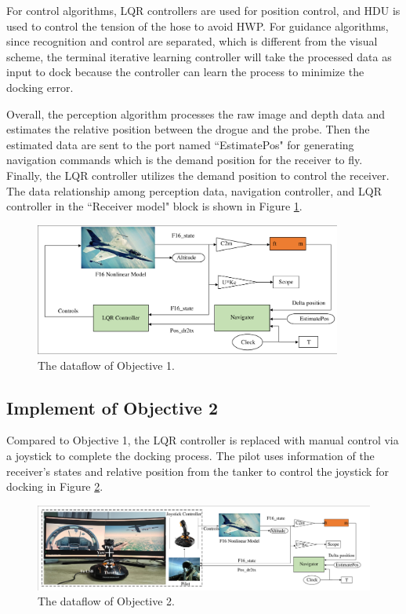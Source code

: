 For control algorithms, LQR controllers are used for position control, and HDU is used to control the tension of the hose to avoid HWP. For guidance algorithms, since recognition and control are separated, which is different from the visual scheme\cite{dayong2022robust,costello2023transference,duan2020bionic}, the terminal iterative learning controller will take the processed data as input to dock because the controller can learn the process to minimize the docking error. 

Overall, the perception algorithm processes the raw image and depth data and estimates the relative position between the drogue and the probe. Then the estimated data are sent to the port named ``EstimatePos" for generating navigation commands which is the demand position for the receiver to fly. Finally, the LQR controller utilizes the demand position to control the receiver. The data relationship among perception data, navigation controller, and LQR controller in the ``Receiver model" block is shown in Figure \ref{FIG_15}.

\begin{figure}[th]
	\centering
	\includegraphics[width=0.9\textwidth]{Figures/Figs_Ch5/Fig15.pdf}
	\caption{The dataflow of Objective 1.}\label{FIG_15}
\end{figure}

\subsection{Implement of Objective 2}\label{sec5.3.2}
Compared to  Objective 1, the LQR controller is replaced with manual control via a joystick to complete the docking process. The pilot uses information of the receiver's states and relative position from the tanker to control the joystick for docking in Figure \ref{FIG_16}.

\begin{figure}[th]
	\centering
	\includegraphics[width=1\textwidth]{Figures/Figs_Ch5/Fig16.pdf}
	\caption{The dataflow of Objective 2.}\label{FIG_16}
\end{figure}


